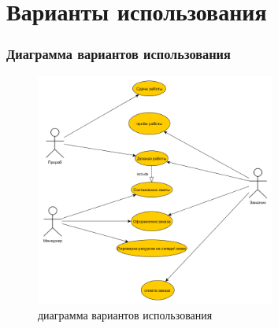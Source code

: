 \section{Варианты использования}
\subsubsection{Диаграмма вариантов использования}
\begin{figure}[!ht]
	\centering
	\includegraphics[width=0.7\textwidth]{img/uml_use_case.png}
	\caption{диаграмма вариантов использования}
\end{figure}
\newpage
